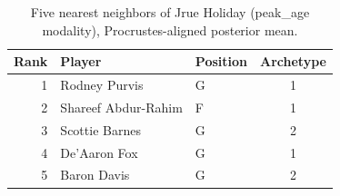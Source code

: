 \begin{table}[htbp]
  \centering\small
  \begin{tabular}{rllc}
    \toprule
    Rank & Player & Position & Archetype \\
    \midrule
    1 & Rodney Purvis & G & 1 \\
    2 & Shareef Abdur-Rahim & F & 1 \\
    3 & Scottie Barnes & G & 2 \\
    4 & De'Aaron Fox & G & 1 \\
    5 & Baron Davis & G & 2 \\
    \bottomrule
  \end{tabular}
  \caption{Five nearest neighbors of Jrue Holiday (peak_age modality), Procrustes-aligned posterior mean.}
  \label{tab:Jrue_Holiday_neighbors_peak_age}
\end{table}

